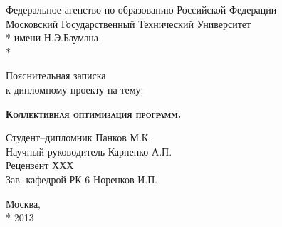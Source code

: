 \begin{titlepage}
\newpage

\begin{center}
Федеральное агенство по образованию Российской Федерации \\
Московский Государственный Технический Университет \\*
имени Н.Э.Баумана \\*
\vspace{-16mm}
\begin{figure}[h]
\end{figure}
\vspace{-16mm}
\hrulefill
\end{center}
\begin{center}
\Large Пояснительная записка \\ к дипломному проекту на тему:
\end{center}

\vspace{2.5em}

\begin{center}
\textsc{\textbf{Коллективная оптимизация программ.}}
\end{center}

\vspace{6em}

\begin{flushleft}
Студент--дипломник \hrulefill Панков М.К. \\
\vspace{1.5em}
Научный руководитель \hrulefill Карпенко А.П.\\
\vspace{1.5em}
Рецензент \hrulefill ХХХ\\
\vspace{1.5em}
Зав. кафедрой РК-6 \hrulefill Норенков И.П.
\end{flushleft}

\vspace{\fill}

\begin{center}
Москва, \\*
2013
\end{center}

\end{titlepage}